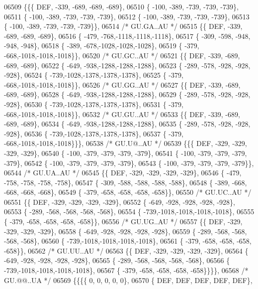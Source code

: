 \begin{DoxyCode}
06509 \{\{\{  DEF, -339, -689, -689, -689\},
06510 \{ -100, -389, -739, -739, -739\},
06511 \{ -100, -389, -739, -739, -739\},
06512 \{ -100, -389, -739, -739, -739\},
06513 \{ -100, -389, -739, -739, -739\}\},
06514 \textcolor{comment}{/* GU.GA..AU */}
06515 \{\{  DEF, -339, -689, -689, -689\},
06516 \{ -479, -768,-1118,-1118,-1118\},
06517 \{ -309, -598, -948, -948, -948\},
06518 \{ -389, -678,-1028,-1028,-1028\},
06519 \{ -379, -668,-1018,-1018,-1018\}\},
06520 \textcolor{comment}{/* GU.GC..AU */}
06521 \{\{  DEF, -339, -689, -689, -689\},
06522 \{ -649, -938,-1288,-1288,-1288\},
06523 \{ -289, -578, -928, -928, -928\},
06524 \{ -739,-1028,-1378,-1378,-1378\},
06525 \{ -379, -668,-1018,-1018,-1018\}\},
06526 \textcolor{comment}{/* GU.GG..AU */}
06527 \{\{  DEF, -339, -689, -689, -689\},
06528 \{ -649, -938,-1288,-1288,-1288\},
06529 \{ -289, -578, -928, -928, -928\},
06530 \{ -739,-1028,-1378,-1378,-1378\},
06531 \{ -379, -668,-1018,-1018,-1018\}\},
06532 \textcolor{comment}{/* GU.GU..AU */}
06533 \{\{  DEF, -339, -689, -689, -689\},
06534 \{ -649, -938,-1288,-1288,-1288\},
06535 \{ -289, -578, -928, -928, -928\},
06536 \{ -739,-1028,-1378,-1378,-1378\},
06537 \{ -379, -668,-1018,-1018,-1018\}\}\},
06538 \textcolor{comment}{/* GU.U@..AU */}
06539 \{\{\{  DEF, -329, -329, -329, -329\},
06540 \{ -100, -379, -379, -379, -379\},
06541 \{ -100, -379, -379, -379, -379\},
06542 \{ -100, -379, -379, -379, -379\},
06543 \{ -100, -379, -379, -379, -379\}\},
06544 \textcolor{comment}{/* GU.UA..AU */}
06545 \{\{  DEF, -329, -329, -329, -329\},
06546 \{ -479, -758, -758, -758, -758\},
06547 \{ -309, -588, -588, -588, -588\},
06548 \{ -389, -668, -668, -668, -668\},
06549 \{ -379, -658, -658, -658, -658\}\},
06550 \textcolor{comment}{/* GU.UC..AU */}
06551 \{\{  DEF, -329, -329, -329, -329\},
06552 \{ -649, -928, -928, -928, -928\},
06553 \{ -289, -568, -568, -568, -568\},
06554 \{ -739,-1018,-1018,-1018,-1018\},
06555 \{ -379, -658, -658, -658, -658\}\},
06556 \textcolor{comment}{/* GU.UG..AU */}
06557 \{\{  DEF, -329, -329, -329, -329\},
06558 \{ -649, -928, -928, -928, -928\},
06559 \{ -289, -568, -568, -568, -568\},
06560 \{ -739,-1018,-1018,-1018,-1018\},
06561 \{ -379, -658, -658, -658, -658\}\},
06562 \textcolor{comment}{/* GU.UU..AU */}
06563 \{\{  DEF, -329, -329, -329, -329\},
06564 \{ -649, -928, -928, -928, -928\},
06565 \{ -289, -568, -568, -568, -568\},
06566 \{ -739,-1018,-1018,-1018,-1018\},
06567 \{ -379, -658, -658, -658, -658\}\}\}\},
06568 \textcolor{comment}{/* GU.@@..UA */}
06569 \{\{\{\{    0,    0,    0,    0,    0\},
06570 \{  DEF,  DEF,  DEF,  DEF,  DEF\},

\end{DoxyCode}
